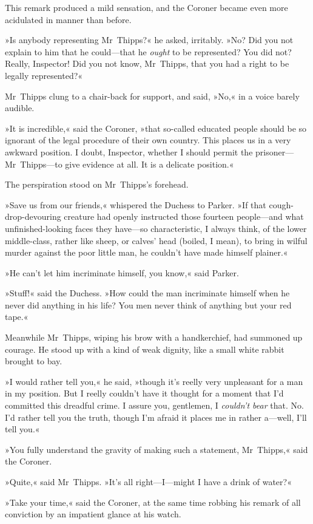 This remark produced a mild sensation, and the Coroner became even more acidulated in manner than before.

»Is anybody representing Mr~Thipps?« he asked, irritably. »No? Did you not explain to him that he could—that he \textit{ought} to be represented? You did not? Really, Inspector! Did you not know, Mr~Thipps, that you had a right to be legally represented?«

Mr~Thipps clung to a chair-back for support, and said, »No,« in a voice barely audible.

»It is incredible,« said the Coroner, »that so-called educated people should be so ignorant of the legal procedure of their own country. This places us in a very awkward position. I doubt, Inspector, whether I should permit the prisoner—Mr~Thipps—to give evidence at all. It is a delicate position.«

The perspiration stood on Mr~Thipps's forehead.

»Save us from our friends,« whispered the Duchess to Parker. »If that cough-drop-devouring creature had openly instructed those fourteen people—and what unfinished-looking faces they have—so characteristic, I always think, of the lower middle-class, rather like sheep, or calves' head (boiled, I mean), to bring in wilful murder against the poor little man, he couldn't have made himself plainer.«

»He can't let him incriminate himself, you know,« said Parker.

»Stuff!« said the Duchess. »How could the man incriminate himself when he never did anything in his life? You men never think of anything but your red tape.«

Meanwhile Mr~Thipps, wiping his brow with a handkerchief, had summoned up courage. He stood up with a kind of weak dignity, like a small white rabbit brought to bay.

»I would rather tell you,« he said, »though it's reelly very unpleasant for a man in my position. But I reelly couldn't have it thought for a moment that I'd committed this dreadful crime. I assure you, gentlemen, I \textit{couldn't bear} that. No. I'd rather tell you the truth, though I'm afraid it places me in rather a—well, I'll tell you.«

»You fully understand the gravity of making such a statement, Mr~Thipps,« said the Coroner.

»Quite,« said Mr~Thipps. »It's all right—I—might I have a drink of water?«

»Take your time,« said the Coroner, at the same time robbing his remark of all conviction by an impatient glance at his watch.

